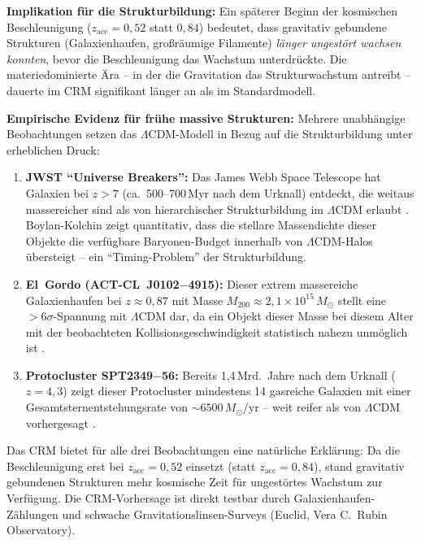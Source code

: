 \documentclass[aps,prd,twocolumn,superscriptaddress,nofootinbib]{revtex4-2}
\begin{document}
\textbf{Implikation f\"ur die Strukturbildung:} Ein sp\"aterer Beginn der kosmischen Beschleunigung ($z_{\mathrm{acc}} = 0{,}52$ statt $0{,}84$) bedeutet, dass gravitativ gebundene Strukturen (Galaxienhaufen, gro\ss{}r\"aumige Filamente) \textit{l\"anger ungest\"ort wachsen konnten}, bevor die Beschleunigung das Wachstum unterdr\"uckte. Die materiedominierte \"Ara -- in der die Gravitation das Strukturwachstum antreibt -- dauerte im CRM signifikant l\"anger an als im Standardmodell.

\textbf{Empirische Evidenz f\"ur fr\"uhe massive Strukturen:} Mehrere unabh\"angige Beobachtungen setzen das $\Lambda$CDM-Modell in Bezug auf die Strukturbildung unter erheblichen Druck:
\begin{enumerate}
\item \textbf{JWST ``Universe Breakers'':} Das James Webb Space Telescope hat Galaxien bei $z > 7$ (ca.\ 500--700\,Myr nach dem Urknall) entdeckt, die weitaus massereicher sind als von hierarchischer Strukturbildung im $\Lambda$CDM erlaubt \cite{Labbe2023}. Boylan-Kolchin \cite{BoylanKolchin2023} zeigt quantitativ, dass die stellare Massendichte dieser Objekte die verf\"ugbare Baryonen-Budget innerhalb von $\Lambda$CDM-Halos \"ubersteigt -- ein ``Timing-Problem'' der Strukturbildung.
\item \textbf{El~Gordo (ACT-CL~J0102$-$4915):} Dieser extrem massereiche Galaxienhaufen bei $z \approx 0{,}87$ mit Masse $M_{200} \approx 2{,}1 \times 10^{15}\,M_\odot$ stellt eine $> 6\sigma$-Spannung mit $\Lambda$CDM dar, da ein Objekt dieser Masse bei diesem Alter mit der beobachteten Kollisionsgeschwindigkeit statistisch nahezu unm\"oglich ist \cite{Asencio2023}.
\item \textbf{Protocluster SPT2349$-$56:} Bereits 1,4\,Mrd.\ Jahre nach dem Urknall ($z = 4{,}3$) zeigt dieser Protocluster mindestens 14 gasreiche Galaxien mit einer Gesamtsternentstehungsrate von $\sim\!6500\,M_\odot$/yr -- weit reifer als von $\Lambda$CDM vorhergesagt \cite{Miller2018}.
\end{enumerate}

Das CRM bietet f\"ur alle drei Beobachtungen eine nat\"urliche Erkl\"arung: Da die Beschleunigung erst bei $z_{\mathrm{acc}} = 0{,}52$ einsetzt (statt $z_{\mathrm{acc}} = 0{,}84$), stand gravitativ gebundenen Strukturen mehr kosmische Zeit f\"ur ungest\"ortes Wachstum zur Verf\"ugung. Die CRM-Vorhersage ist direkt testbar durch Galaxienhaufen-Z\"ahlungen und schwache Gravitationslinsen-Surveys (Euclid, Vera C.\ Rubin Observatory).
\end{document}
